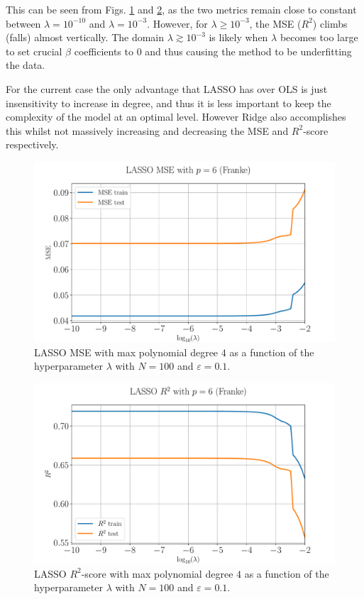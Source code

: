 \documentclass[%
reprint,
amsmath,amssymb,
aps,
pra,
]{revtex4-2}
\begin{document}
This can be seen from Figs. \ref{fig:LASSO_logMSE_degree} and \ref{fig:LASSO_logR2_degree}, as the two metrics remain close to constant between $\lambda=10^{-10}$ and $\lambda=10^{-3}$. However, for \(\lambda\geq 10^{-3}\), the MSE (\(R^2\)) climbs (falls) almost vertically. The domain \(\lambda\gtrsim 10^{-3}\) is likely when $\lambda$ becomes too large to set crucial $\beta$ coefficients to $0$ and thus causing the method to be underfitting the data.

For the current case the only advantage that LASSO has over OLS is just insensitivity to increase in degree, and thus it is less important to keep the complexity of the model at an optimal level. However Ridge also accomplishes this whilst not massively increasing and decreasing the MSE and $R^2$-score respectively.
\begin{figure}[ht!]
	\centering
	\includegraphics[width=\linewidth]{Python/Figures/LASSO/LASSO_logMSE_Unscaled.pdf}
	\caption{LASSO MSE with max polynomial degree $4$ as a function of the hyperparameter $\lambda$ with $N=100$ and $\varepsilon=0.1$.}
	\label{fig:LASSO_logMSE_degree}
\end{figure}

\begin{figure}[ht!]
	\centering
	\includegraphics[width=\linewidth]{Python/Figures/LASSO/LASSO_logR2_Unscaled.pdf}
	\caption{LASSO $R^2$-score with max polynomial degree $4$ as a function of the hyperparameter $\lambda$ with $N=100$ and $\varepsilon=0.1$.}
	\label{fig:LASSO_logR2_degree}
\end{figure}
\end{document}
